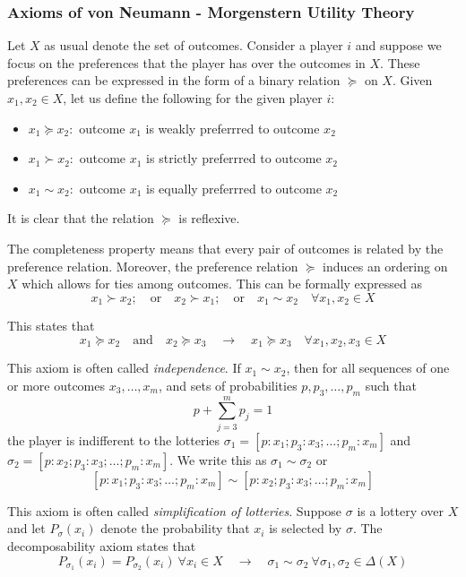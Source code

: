 \subsubsection{Axioms of von Neumann - Morgenstern Utility Theory}
Let $X$ as usual denote the set of outcomes.
Consider a player $i$ and suppose we focus on the preferences that the player has over the outcomes in $X$.
These preferences can be expressed in the form of a binary relation $\succeq$ on $X$.
Given $x_1, x_2 \in X$, let us define the following for the given player $i$:
\begin{itemize}
	\item $x_1 \succeq x_2:$ outcome $x_1$ is weakly preferrred to outcome $x_2$
	\item $x_1 \succ x_2:$ outcome $x_1$ is strictly preferrred to outcome $x_2$
	\item $x_1 \sim x_2:$ outcome $x_1$ is equally preferrred to outcome $x_2$
\end{itemize}
It is clear that the relation $\succeq$ is reflexive.
\begin{ax}[Completeness]
	The completeness property means that every pair of outcomes is related by the preference relation.
	Moreover, the preference relation $\succeq$ induces an ordering on $X$ which allows for ties among outcomes.
	This can be formally expressed as
	\[x_1\succ x_2; \quad\text{or}\quad x_2\succ x_1; \quad\text{or}\quad x_1\sim x_2\quad  \forall x_1,x_2\in X\]
\end{ax}
\begin{ax}[Transitivity]
	This states that
	\[x_1\succeq x_2 \quad\text{and}\quad x_2\succeq x_3 \quad\rightarrow\quad x_1\succeq x_3\quad  \forall x_1,x_2,x_3\in X\]
\end{ax}
\begin{ax}[Substitutability]
	This axiom is often called \emph{independence}.
	If $x_1 \sim x_2$, then for all sequences of one or more outcomes $x_3,\ldots, x_m$, and sets of probabilities $p, p_3,\ldots, p_m$ such that
	\[p+\sum_{j=3}^m p_j=1\]
	the player is indifferent to the lotteries $\sigma_1 = [p : x_1; p_3 : x_3 ;\ldots; p_m : x_m]$ and $\sigma_2 = [p : x_2; p_3 : x_3 ;\ldots; p_m : x_m]$.
	We write this as $\sigma_1 \sim \sigma_2$ or
	\[[p : x_1; p_3 : x_3 ;\ldots; p_m : x_m] \sim [p : x_2; p_3 : x_3 ;\ldots; p_m : x_m]\]
\end{ax}
\begin{ax}[Decomposability]
	This axiom is often called \emph{simplification of lotteries}.
	Suppose $\sigma$ is a lottery over $X$ and let $P_\sigma(x_i)$ denote the probability that $x_i$ is selected by $\sigma$.
	The decomposability axiom states that
	\[P_{\sigma_1}(x_i)= P_{\sigma_2}(x_i)\ \forall x_i\in X \quad\rightarrow\quad \sigma_1\sim\sigma_2\ \forall\sigma_1,\sigma_2\in\Delta(X)\]
\end{ax}
